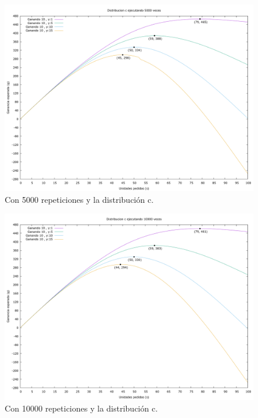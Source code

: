 \documentclass[12pt, spanish]{article}
\begin{document}
\begin{figure}[H]
	\centering
	\includegraphics[scale = 0.3]{prob_c/datos_c_5000.png}
	\caption{Con 5000 repeticiones y la distribución c.}
	\label{fig:ej1_a_5000}

\end{figure}


\begin{figure}[H]
	\centering
	\includegraphics[scale = 0.3]{prob_c/datos_c_10000.png}
	\caption{Con 10000 repeticiones y la distribución c.}
	\label{fig:ej1_a_10000}

\end{figure}
\end{document}
